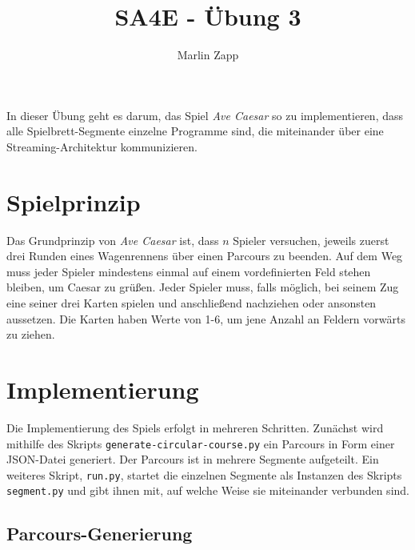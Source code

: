 \documentclass[]{article}
\title{SA4E - Übung 3}
\author{Marlin Zapp}
\begin{document}
\maketitle

In dieser Übung geht es darum, das Spiel \emph{Ave Caesar} so zu implementieren, dass alle Spielbrett-Segmente einzelne Programme sind, die miteinander über eine Streaming-Architektur kommunizieren.

\tableofcontents

\section{Spielprinzip}
\label{sec:spielprinzip}

Das Grundprinzip von \emph{Ave Caesar} ist, dass $n$ Spieler versuchen, jeweils zuerst drei Runden eines Wagenrennens über einen Parcours zu beenden. Auf dem Weg muss jeder Spieler mindestens einmal auf einem vordefinierten Feld stehen bleiben, um Caesar zu grüßen. Jeder Spieler muss, falls möglich, bei seinem Zug eine seiner drei Karten spielen und anschließend nachziehen oder ansonsten aussetzen. Die Karten haben Werte von 1-6, um jene Anzahl an Feldern vorwärts zu ziehen.

\section{Implementierung}
\label{sec:implementierung}

Die Implementierung des Spiels erfolgt in mehreren Schritten. Zunächst wird mithilfe des Skripts \texttt{generate-circular-course.py} ein Parcours in Form einer JSON-Datei generiert. Der Parcours ist in mehrere Segmente aufgeteilt. Ein weiteres Skript, \texttt{run.py}, startet die einzelnen Segmente als Instanzen des Skripts \texttt{segment.py} und gibt ihnen mit, auf welche Weise sie miteinander verbunden sind.

\subsection{Parcours-Generierung}
\label{subsec:parcours-generierung}
\end{document}
